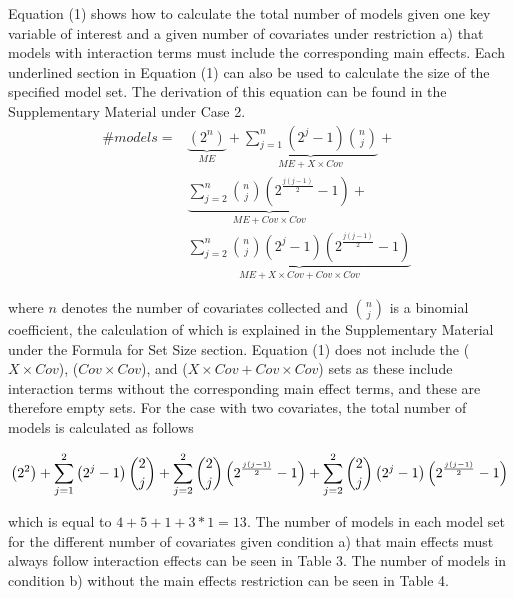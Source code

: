 Equation (1) shows how to calculate the total number of models given one key variable of interest and a given number of covariates under restriction a) that models with interaction terms must include the corresponding main effects. Each underlined section in Equation (1) can also be used to calculate the size of the specified model set. The derivation of this equation can be found in the Supplementary Material under Case 2. \\

\begin{equation} 
\begin{aligned}
\#models={} & \underbrace{\left(2^n\right)}_{ME}+\underbrace{\sum^n_{j=1}{\left(2^j-1\right)\binom{n}{j}}}_{ME + X \times Cov} + \\ 
& \underbrace{\sum^n_{j=2}{\binom{n}{j}\left(2^{\frac{j\left(j-1\right)}{2}}-1\right)}}_{ME + Cov \times Cov} + \\
& \underbrace{\sum^n_{j=2}{\binom{n}{j}\left(2^j-1\right)\left(2^{\frac{j\left(j-1\right)}{2}}-1\right)}}_{ME + X \times Cov + Cov \times Cov}\ \  
\end{aligned}
\end{equation} 

where $n$ denotes the number of covariates collected and $\binom{n}{j}$ is a binomial coefficient, the calculation of which is explained in the Supplementary Material under the Formula for Set Size section.
Equation (1) does not include the ($X \times Cov$), ($Cov \times Cov$), and ($X \times Cov + Cov \times Cov$) sets as these include interaction terms without the corresponding main effect terms, and these are therefore empty sets. For the case with two covariates, the total number of models is calculated as follows

\begin{equation*}
\centering
\left(2^2\right)+
\sum^2_{j=1}{\left(2^j-1\right) \binom{2}{j}}+
\sum^2_{j=2}{\binom{2}{j}\left(2^{\frac{j\left(j-1\right)}{2}}-1\right)}+  
\sum^2_{j=2}{\binom{2}{j}\left(2^j-1\right)\left(2^{\frac{j\left(j-1\right)}{2}}-1\right)}
\end{equation*}

which is equal to $4+5+1+3*1=13$. The number of models in each model set for the different number of covariates given condition a) that main effects must always follow interaction effects can be seen in Table 3. The number of models in condition b) without the main effects restriction can be seen in Table 4. \\

